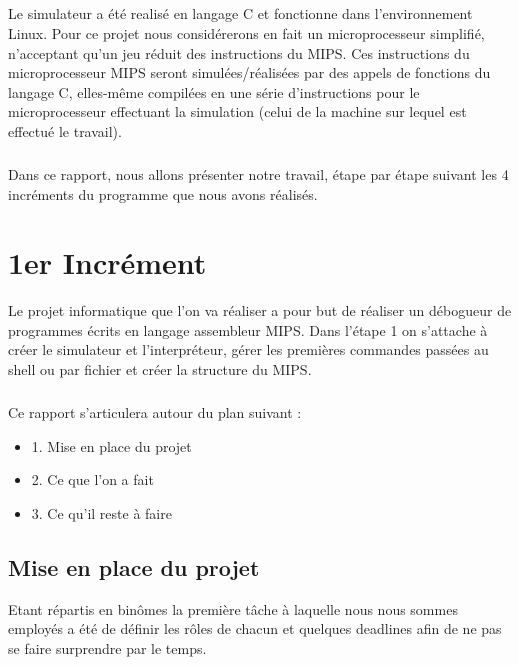 \documentclass[10pt,a4paper]{report}
\begin{document}
\paragraph{}
Le simulateur a été realisé en langage C et fonctionne dans l'environnement Linux. Pour ce projet nous considérerons en fait un microprocesseur simplifié, n'acceptant qu'un jeu réduit des instructions du MIPS. Ces instructions du microprocesseur MIPS seront simulées/réalisées par des appels de fonctions du langage C, elles-même compilées en une série d'instructions pour le
microprocesseur effectuant la simulation (celui de la machine sur lequel est effectué le travail).

\paragraph{}
Dans ce rapport, nous allons présenter notre travail, étape par étape suivant les 4 incréments du programme que nous avons réalisés.

\chapter{1er Incrément}

Le projet informatique que l'on va réaliser a pour but de réaliser un débogueur de programmes écrits en langage assembleur MIPS. Dans l'étape 1 on s'attache à créer le simulateur et l'interpréteur, gérer les premières commandes passées au shell ou par fichier et créer la structure du MIPS.

\paragraph{}
	Ce rapport s'articulera autour du plan suivant :
	\begin{itemize}
  	\item 1. Mise en place du projet
	\item 2. Ce que l'on a fait
	\item 3. Ce qu'il reste à faire
\end{itemize}	


\section{Mise en place du projet}

Etant répartis en binômes la première tâche à laquelle nous nous sommes employés a été de définir les rôles de chacun et quelques deadlines afin de ne pas se faire surprendre par le temps.
\end{document}
